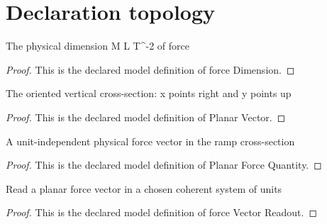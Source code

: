 \section{Declaration topology}
\begin{definition}
  \label{def:physics:phyx-mini-0799:phyxminiproblems-problemphyxmini0799-forcedimension}
  The physical dimension M L T\textasciicircum{}-2 of force
\end{definition}
\begin{proof}
  This is the declared model definition of force Dimension.
\end{proof}
\begin{definition}
  \label{def:physics:phyx-mini-0799:phyxminiproblems-problemphyxmini0799-planarvector}
  The oriented vertical cross-section: x points right and y points up
\end{definition}
\begin{proof}
  This is the declared model definition of Planar Vector.
\end{proof}
\begin{definition}
  \label{def:physics:phyx-mini-0799:phyxminiproblems-problemphyxmini0799-planarforcequantity}
  A unit-independent physical force vector in the ramp cross-section
\end{definition}
\begin{proof}
  This is the declared model definition of Planar Force Quantity.
\end{proof}
\begin{definition}
  \label{def:physics:phyx-mini-0799:phyxminiproblems-problemphyxmini0799-forcevectorreadout}
  Read a planar force vector in a chosen coherent system of units
\end{definition}
\begin{proof}
  This is the declared model definition of force Vector Readout.
\end{proof}
